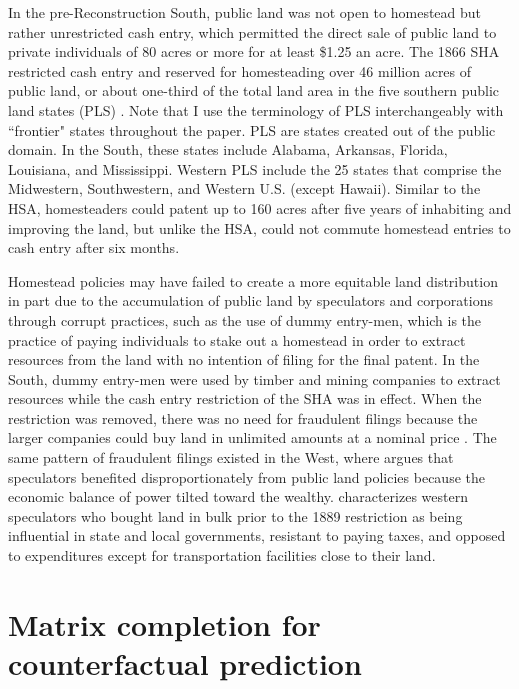 \documentclass[12pt]{article}
\begin{document}
In the pre-Reconstruction South, public land was not open to homestead but rather unrestricted cash entry, which permitted the direct sale of public land to private individuals of 80 acres or more for at least \$1.25 an acre. The 1866 SHA restricted cash entry and reserved for homesteading over 46 million acres of public land, or about one-third of the total land area in the five southern public land states (PLS) \citep[pp. 13]{lanza1999agrarianism}. Note that I use the terminology of PLS interchangeably with ``frontier" states throughout the paper. PLS are states created out of the public domain. In the South, these states include Alabama, Arkansas, Florida, Louisiana, and Mississippi. Western PLS include the 25 states that comprise the Midwestern, Southwestern, and Western U.S. (except Hawaii). Similar to the HSA, homesteaders could patent up to 160 acres after five years of inhabiting and improving the land, but unlike the HSA, could not commute homestead entries to cash entry after six months.%

Homestead policies may have failed to create a more equitable land distribution in part due to the accumulation of public land by speculators and corporations through corrupt practices, such as the use of dummy entry-men, which is the practice of paying individuals to stake out a homestead in order to extract resources from the land with no intention of filing for the final patent. In the South, dummy entry-men were used by timber and mining companies to extract resources while the cash entry restriction of the SHA was in effect. When the restriction was removed, there was no need for fraudulent filings because the larger companies could buy land in unlimited amounts at a nominal price \citep{gates1940federal, gates1979federal}. The same pattern of fraudulent filings existed in the West, where \citet{murtazashvili2013political} argues that speculators benefited disproportionately from public land policies because the economic balance of power tilted toward the wealthy. \citet{gates1942role} characterizes western speculators who bought land in bulk prior to the 1889 restriction as being influential in state and local governments, resistant to paying taxes, and opposed to expenditures except for transportation facilities close to their land. 

\section{Matrix completion for counterfactual prediction} \label{estimation}
\end{document}

